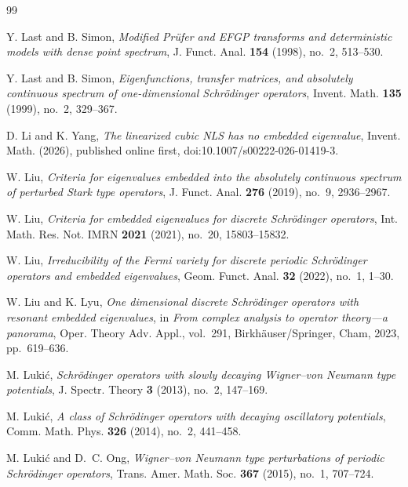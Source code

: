 \documentclass[12pt]{amsart}
\theoremstyle{plain}
\theoremstyle{definition}
\begin{document}
\begin{thebibliography}{99}
	
	Y. Last and B. Simon,
	\emph{Modified Pr\"ufer and EFGP transforms and deterministic models
		with dense point spectrum},
	J. Funct. Anal. \textbf{154} (1998), no.~2, 513--530.
	
	Y. Last and B. Simon,
	\emph{Eigenfunctions, transfer matrices, and absolutely continuous
		spectrum of one-dimensional Schr\"odinger operators},
	Invent. Math. \textbf{135} (1999), no.~2, 329--367.
	
	
	
	
	D. Li and K. Yang,
	\emph{The linearized cubic NLS has no embedded eigenvalue},
	Invent. Math. (2026), published online first,
	doi:10.1007/s00222-026-01419-3.
	
	W. Liu,
	\emph{Criteria for eigenvalues embedded into the absolutely
		continuous spectrum of perturbed Stark type operators},
	J. Funct. Anal. \textbf{276} (2019), no.~9, 2936--2967.
	
	
	W. Liu,
	\emph{Criteria for embedded eigenvalues for discrete Schr\"odinger
		operators},
	Int. Math. Res. Not. IMRN \textbf{2021} (2021), no.~20,
	15803--15832.
	
	
	
	W. Liu,
	\emph{Irreducibility of the Fermi variety for discrete periodic
		Schr\"odinger operators and embedded eigenvalues},
	Geom. Funct. Anal. \textbf{32} (2022), no.~1, 1--30.
	
	
	
	W. Liu and K. Lyu,
	\emph{One dimensional discrete Schr\"odinger operators with resonant
		embedded eigenvalues},
	in \emph{From complex analysis to operator theory---a panorama},
	Oper. Theory Adv. Appl., vol.~291, Birkh\"auser/Springer, Cham, 2023,
	pp.~619--636.
	
	M. Luki\'c,
	\emph{Schr\"odinger operators with slowly decaying Wigner--von Neumann
		type potentials},
	J. Spectr. Theory \textbf{3} (2013), no.~2, 147--169.
	
	M. Luki\'c,
	\emph{A class of Schr\"odinger operators with decaying oscillatory
		potentials},
	Comm. Math. Phys. \textbf{326} (2014), no.~2, 441--458.
	
	M. Luki\'c and D.~C. Ong,
	\emph{Wigner--von Neumann type perturbations of periodic
		Schr\"odinger operators},
	Trans. Amer. Math. Soc. \textbf{367} (2015), no.~1, 707--724.
	

\end{thebibliography}
\end{document}
